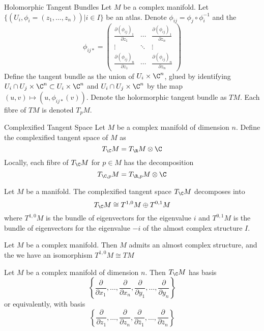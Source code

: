 \documentclass[a4paper]{article}
\begin{document}
\begin{defn}{Holomorphic Tangent Bundles}{} Let $M$ be a complex manifold. Let $\{(U_i,\phi_i=(z_1,\dots,z_n))|i\in I\}$ be an atlas. Denote $\phi_{ij}=\phi_j\circ\phi_i^{-1}$ and the $$\phi_{ij\ast}=\begin{pmatrix}
\frac{\partial (\phi_{ij})_1}{\partial z_1} & \cdots & \frac{\partial (\phi_{ij})_1}{\partial z_n}\\
\vdots & \ddots & \vdots\\
\frac{\partial (\phi_{ij})_n}{\partial z_1} & \cdots & \frac{\partial (\phi_{ij})_n}{\partial z_n}
\end{pmatrix}$$ Define the tangent bundle as the union of $U_i\times\C^n$, glued by identifying $U_i\cap U_j\times\C^n\subset U_i\times\C^n$ and $U_i\cap U_j\times\C^n$ by the map $(u,v)\mapsto(u,\phi_{ij\ast}(v))$. Denote the holormorphic tangent bundle as $TM$. Each fibre of $TM$ is denoted $T_pM$. 
\end{defn}

\begin{defn}{Complexified Tangent Space}{} Let $M$ be a complex manifold of dimension $n$. Define the complexified tangent space of $M$ as $$T_{\C}M=T_{\R}M\otimes \C$$ Locally, each fibre of $T_{\C}M$ for $p\in M$ has the decomposition $$T_{\C,p}M=T_{\R,p}M\otimes\C$$
\end{defn}

\begin{prp}{}{} Let $M$ be a manifold. The complexified tangent space $T_{\C}M$ decomposes into $$T_{\C}M\cong T^{1,0}M\oplus T^{0,1}M$$ where $T^{1,0}M$ is the bundle of eigenvectors for the eigenvalue $i$ and $T^{0,1}M$ is the bundle of eigenvectors for the eigenvalue $-i$ of the almost complex structure $I$. 
\end{prp}

\begin{prp}{}{} Let $M$ be a complex manifold. Then $M$ admits an almost complex structure, and the we have an isomorphism $T^{1,0}M\cong TM$
\end{prp}

\begin{prp}{}{} Let $M$ be a complex manifold of dimension $n$. Then $T_{\C}M$ has basis $$\left\{\frac{\partial}{\partial x_1},\dots,\frac{\partial}{\partial x_n},\frac{\partial}{\partial y_1},\dots,\frac{\partial}{\partial y_n}\right\}$$ or equivalently, with basis $$\left\{\frac{\partial}{\partial z_1},\dots,\frac{\partial}{\partial z_n},\frac{\partial}{\partial \bar{z}_1},\dots,\frac{\partial}{\partial \bar{z}_n}\right\}$$
\end{prp}
\end{document}
